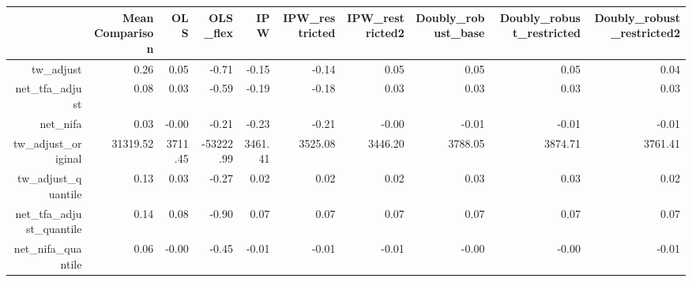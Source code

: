 \begin{table}[ht]
\centering
\begin{tabular}{rrrrrrrrrr}
  \hline
 & Mean Comparison & OLS & OLS\_flex & IPW & IPW\_restricted & IPW\_restricted2 & Doubly\_robust\_base & Doubly\_robust\_restricted & Doubly\_robust\_restricted2 \\ 
  \hline
tw\_adjust & 0.26 & 0.05 & -0.71 & -0.15 & -0.14 & 0.05 & 0.05 & 0.05 & 0.04 \\ 
  net\_tfa\_adjust & 0.08 & 0.03 & -0.59 & -0.19 & -0.18 & 0.03 & 0.03 & 0.03 & 0.03 \\ 
  net\_nifa & 0.03 & -0.00 & -0.21 & -0.23 & -0.21 & -0.00 & -0.01 & -0.01 & -0.01 \\ 
  tw\_adjust\_original & 31319.52 & 3711.45 & -53222.99 & 3461.41 & 3525.08 & 3446.20 & 3788.05 & 3874.71 & 3761.41 \\ 
  tw\_adjust\_quantile & 0.13 & 0.03 & -0.27 & 0.02 & 0.02 & 0.02 & 0.03 & 0.03 & 0.02 \\ 
  net\_tfa\_adjust\_quantile & 0.14 & 0.08 & -0.90 & 0.07 & 0.07 & 0.07 & 0.07 & 0.07 & 0.07 \\ 
  net\_nifa\_quantile & 0.06 & -0.00 & -0.45 & -0.01 & -0.01 & -0.01 & -0.00 & -0.00 & -0.01 \\ 
   \hline
\end{tabular}
\end{table}
